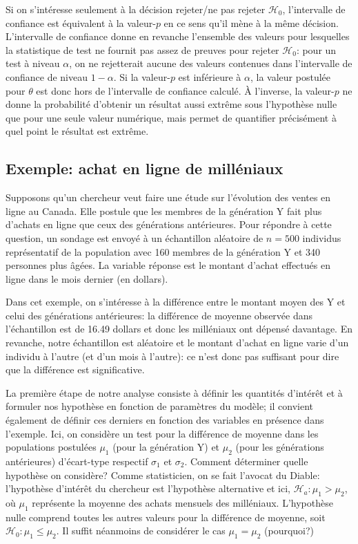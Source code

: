 \documentclass[
  11pt,
  letterpaper,
]{book}
\begin{document}
Si on s'intéresse seulement à la décision rejeter/ne pas rejeter \(\mathscr{H}_0\), l'intervalle de confiance est équivalent à la valeur-\(p\) en ce sens qu'il mène à la même décision. L'intervalle de confiance donne en revanche l'ensemble des valeurs pour lesquelles la statistique de test ne fournit pas assez de preuves pour rejeter \(\mathscr{H}_0\): pour un test à niveau \(\alpha\), on ne rejetterait aucune des valeurs contenues dans l'intervalle de confiance de niveau \(1-\alpha\). Si la valeur-\(p\) est inférieure à \(\alpha\), la valeur postulée pour \(\theta\) est donc hors de l'intervalle de confiance calculé. À l'inverse, la valeur-\(p\) ne donne la probabilité d'obtenir un résultat aussi extrême sous l'hypothèse nulle que pour une seule valeur numérique, mais permet de quantifier précisément à quel point le résultat est extrême.

\hypertarget{exemple-achat-en-ligne-de-milluxe9niaux}{%
\subsection{Exemple: achat en ligne de milléniaux}\label{exemple-achat-en-ligne-de-milluxe9niaux}}

Supposons qu'un chercheur veut faire une étude sur l'évolution des ventes en ligne au Canada. Elle postule que les membres de la génération Y fait plus d'achats en ligne que ceux des générations antérieures. Pour répondre à cette question, un sondage est envoyé à un échantillon aléatoire de \(n=500\) individus représentatif de la population avec 160 membres de la génération Y et 340 personnes plus âgées. La variable réponse est le montant d'achat effectués en ligne dans le mois dernier (en dollars).

Dans cet exemple, on s'intéresse à la différence entre le montant moyen des Y et celui des générations antérieures: la différence de moyenne observée dans l'échantillon est de 16.49 dollars et donc les milléniaux ont dépensé davantage. En revanche, notre échantillon est aléatoire et le montant d'achat en ligne varie d'un individu à l'autre (et d'un mois à l'autre): ce n'est donc pas suffisant pour dire que la différence est significative.

La première étape de notre analyse consiste à définir les quantités d'intérêt et à formuler nos hypothèse en fonction de paramètres du modèle; il convient également de définir ces derniers en fonction des variables en présence dans l'exemple. Ici, on considère un test pour la différence de moyenne dans les populations postulées \(\mu_1\) (pour la génération Y) et \(\mu_2\) (pour les générations antérieures) d'écart-type respectif \(\sigma_1\) et \(\sigma_2\). Comment déterminer quelle hypothèse on considère? Comme statisticien, on se fait l'avocat du Diable: l'hypothèse d'intérêt du chercheur est l'hypothèse alternative et ici, \(\mathscr{H}_a: \mu_1 > \mu_2\), où \(\mu_1\) représente la moyenne des achats mensuels des milléniaux. L'hypothèse nulle comprend toutes les autres valeurs pour la différence de moyenne, soit \(\mathscr{H}_0: \mu_1 \leq \mu_2\). Il suffit néanmoins de considérer le cas \(\mu_1=\mu_2\) (pourquoi?)
\end{document}

